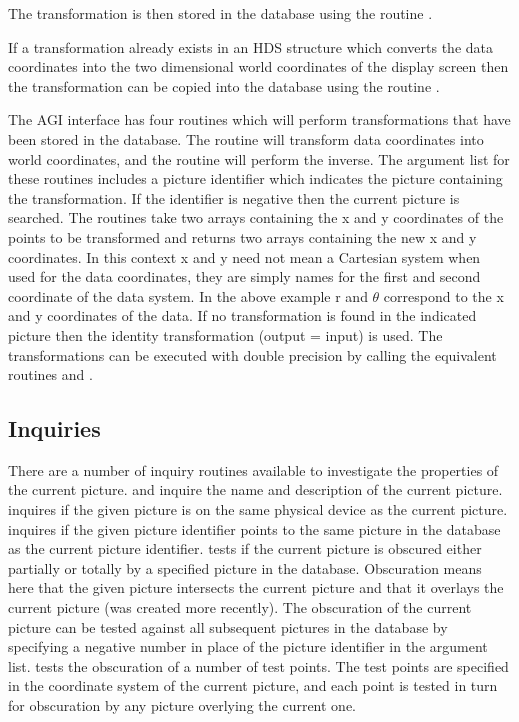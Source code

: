 \documentclass[twoside,11pt]{starlink}
\begin{document}
The transformation is then stored in the database using the routine
.

If a transformation already exists in an HDS structure which converts
the data coordinates into the two dimensional world coordinates of the
display screen then the transformation can be copied into the database
using the routine .

The AGI interface has four routines which will perform transformations
that have been stored in the database. The routine
will transform data coordinates into world coordinates, and the routine
 will perform the inverse.
The argument list for these routines includes a picture identifier which
indicates the picture containing the transformation. If the identifier is
negative then the current picture is searched.
The routines take two arrays containing the x and y coordinates of the
points to be transformed and returns two arrays containing the new
x and y coordinates. In this context x and y need not mean a
Cartesian system when used for the data coordinates, they are simply
names for the first and second coordinate of the data system. In the above
example r and $\theta$ correspond to the x and y coordinates of the
data. If no transformation is found in the indicated picture then the
identity transformation (output = input) is used. The transformations
can be executed with double precision by calling the equivalent routines
 and .

\subsection{Inquiries}
There are a number of inquiry routines available to investigate the properties
of the current picture.
 and
 inquire the name and description of the
current picture.
 inquires if the given picture is on
the same physical device as the current picture.
 inquires if the given picture identifier
points to the same picture in the database as the current picture identifier.
 tests if the current picture is
obscured either partially or totally by a specified picture in the database.
Obscuration means here that the given picture intersects the current picture
and that it overlays the current picture (was created more recently).
The obscuration of the current picture can be tested against all subsequent
pictures in the database by specifying a negative number in place of the
picture identifier in the argument list.
 tests the obscuration of a number
of test points.
The test points are specified in the coordinate system of the current picture,
and each point is tested in turn for obscuration by any picture overlying the
current one.
\end{document}
